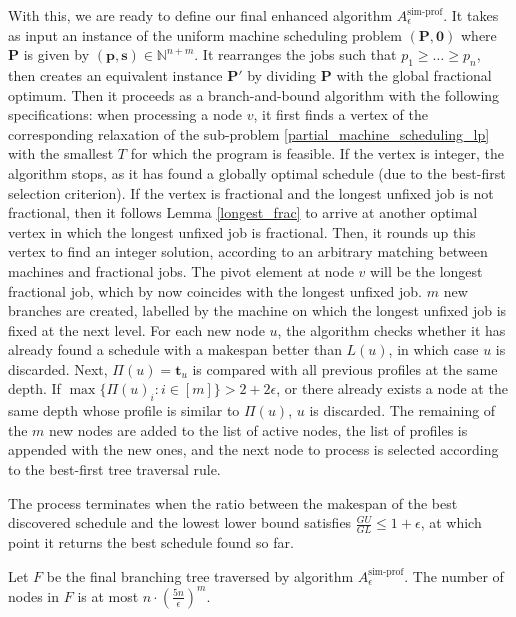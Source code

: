 \documentclass[a4paper,UKenglish,cleveref, autoref, thm-restate, pdfa]{lipics-v2021}
\theoremstyle{plain}
\begin{document}
With this, we are ready to define our final enhanced algorithm $A^{\text{sim-prof}}_{\epsilon}$. It takes as input an instance of the uniform machine scheduling problem $(\bm{P}, \bm{0})$ where $\bm{P}$ is given by $(\bm{p}, \bm{s}) \in \mathbb{N}^{n+m}$. It rearranges the jobs such that $p_1 \ge \ldots \ge p_n$, then creates an equivalent instance $\bm{P}'$ by dividing $\bm{P}$ with the global fractional optimum. Then it proceeds as a branch-and-bound algorithm with the following specifications: when processing a node $v$, it first finds a vertex of the corresponding relaxation of the sub-problem \eqref{partial_machine_scheduling_lp} with the smallest $T$ for which the program is feasible. If the vertex is  integer, the algorithm stops, as it has found a globally optimal schedule (due to the best-first selection criterion). If the vertex is fractional and the longest unfixed job is not fractional, then it follows Lemma \ref{longest_frac} to arrive at another optimal vertex in which the longest unfixed job is fractional. Then, it rounds up this vertex to find an integer solution, according to an arbitrary matching between machines and fractional jobs. The pivot element at node $v$ will be the longest fractional job, which by now coincides with the longest unfixed job. $m$ new branches are created, labelled by the machine on which the longest unfixed job is fixed at the next level. For each new node $u$, the algorithm checks whether it has already found a schedule with a makespan better than $L(u)$, in which case $u$ is discarded. Next, $\Pi(u) = \bm{t}_u$ is compared with all previous profiles at the same depth. If $\max\{\Pi(u)_i: i \in [m]\} > 2+2\epsilon$, or there already exists a node at the same depth whose profile is similar to $\Pi(u)$, $u$ is discarded. The remaining of the $m$ new nodes are added to the list of active nodes, the list of profiles is appended with the new ones, and the next node to process is selected according to the best-first tree traversal rule.

The process terminates when the ratio between the makespan of the best discovered schedule and the lowest lower bound satisfies $\frac{GU}{GL} \le 1+ \epsilon$, at which point it returns the best schedule found so far.

\begin{lmm}\label{fptas_size}
    Let $F$ be the final branching tree traversed by algorithm $A^{\text{sim-prof}}_{\epsilon}$. The number of nodes in $F$ is at most $n\cdot \left(\frac{5n}{\epsilon}\right)^m$.
\end{lmm}
\end{document}
